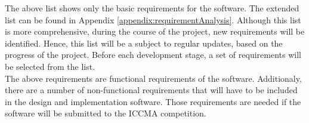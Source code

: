 The above list shows only the basic requirements for the software. The extended list can be found in Appendix \ref{appendix:requirementAnalysis}. Although this list is more comprehensive, during the course of the project, new requirements will be identified. Hence, this list will be a subject to regular updates, based on the progress of the project. Before each development stage, a set of requirements will be selected from the list. \\
The above requirements are functional requirements of the software. Additionaly, there are a number of non-functional requirements that will have to be included in the design and implementation software. Those requirements are needed if the software will be submitted to the ICCMA competition. 